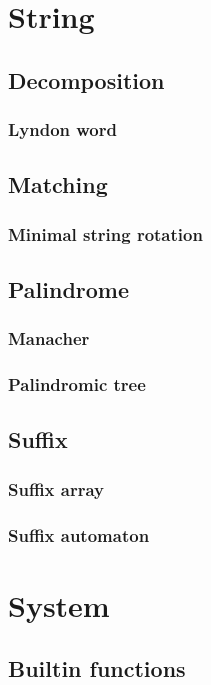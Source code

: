 \documentclass[titlepage,a4paper,10pt]{article}
\begin{document}
\begin{multicols}{2}
\begin{spacing}{0.8}
{		\section{String}
			\subsection{Decomposition}
				\subsubsection{Lyndon word}
					
			\subsection{Matching}
				\subsubsection{Minimal string rotation}
					
			\subsection{Palindrome}
				\subsubsection{Manacher}
					
				\subsubsection{Palindromic tree}
					
			\subsection{Suffix}
				\subsubsection{Suffix array}
					
				\subsubsection{Suffix automaton}
					
		\section{System}
			\subsection{Builtin functions}
				
}
\end{spacing}
\end{multicols}
\end{document}
